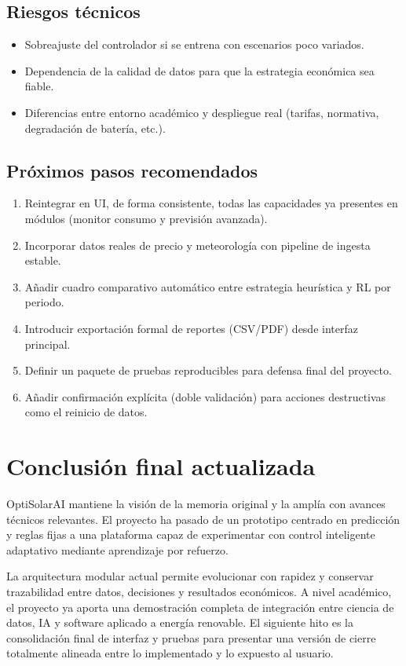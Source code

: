 \documentclass[12pt,a4paper]{article}
\begin{document}
\subsection{Riesgos t\'ecnicos}
\begin{itemize}
    \item Sobreajuste del controlador si se entrena con escenarios poco variados.
    \item Dependencia de la calidad de datos para que la estrategia econ\'omica sea fiable.
    \item Diferencias entre entorno acad\'emico y despliegue real (tarifas, normativa, degradaci\'on de bater\'ia, etc.).
\end{itemize}

\subsection{Pr\'oximos pasos recomendados}
\begin{enumerate}
    \item Reintegrar en UI, de forma consistente, todas las capacidades ya presentes en m\'odulos (monitor consumo y previsi\'on avanzada).
    \item Incorporar datos reales de precio y meteorolog\'ia con pipeline de ingesta estable.
    \item A\~nadir cuadro comparativo autom\'atico entre estrategia heur\'istica y RL por periodo.
    \item Introducir exportaci\'on formal de reportes (CSV/PDF) desde interfaz principal.
    \item Definir un paquete de pruebas reproducibles para defensa final del proyecto.
    \item A\~nadir confirmaci\'on expl\'icita (doble validaci\'on) para acciones destructivas como el reinicio de datos.
\end{enumerate}

\section{Conclusi\'on final actualizada}
OptiSolarAI mantiene la visi\'on de la memoria original y la ampl\'ia con avances t\'ecnicos relevantes. El proyecto ha pasado de un prototipo centrado en predicci\'on y reglas fijas a una plataforma capaz de experimentar con control inteligente adaptativo mediante aprendizaje por refuerzo.

La arquitectura modular actual permite evolucionar con rapidez y conservar trazabilidad entre datos, decisiones y resultados econ\'omicos. A nivel acad\'emico, el proyecto ya aporta una demostraci\'on completa de integraci\'on entre ciencia de datos, IA y software aplicado a energ\'ia renovable. El siguiente hito es la consolidaci\'on final de interfaz y pruebas para presentar una versi\'on de cierre totalmente alineada entre lo implementado y lo expuesto al usuario.
\end{document}
